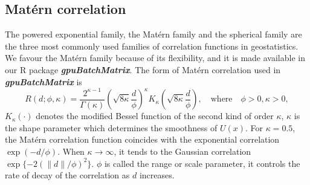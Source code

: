 \documentclass{article}\usepackage[]{graphicx}\usepackage[]{color}
\newcommand{\prog}[1]{\textsf{#1}}
\newcommand{\pkg}[1]{\textbf{\emph{#1}}}
\begin{document}
\subsection{Mat\'ern correlation}
The powered exponential family, the Mat\'ern family and the spherical family are the three most commonly used families of correlation functions in geostatistics. We favour the Mat\'ern family because of its flexibility, and it is made available in our \prog{R} package \pkg{gpuBatchMatrix}. The form of Mat\'ern correlation used in \pkg{gpuBatchMatrix} is 
\begin{equation*}
R(d;\phi,\kappa)=\frac{2^{\kappa-1}}{\Gamma(\kappa)} (\sqrt{8\kappa} \frac{d}{\phi})^\kappa  K_\kappa(\sqrt{8\kappa}  \frac{d}{\phi}),  \quad \text{where} \quad \phi>0,  \kappa > 0,
\end{equation*} 
$K_\kappa(\cdot)$ denotes the modified Bessel function of the second kind of order $\kappa$, 
$\kappa$ is the shape parameter which determines the smoothness of $U(x)$. For $\kappa=0.5$, the Mat\'ern correlation function coincides with the exponential correlation $\exp(-d/\phi)$. When $\kappa \rightarrow \infty$, it tends to the Gaussian correlation $\exp{\{-2(\|d\|/\phi)^2\}}$.
$\phi$ is called the range or scale parameter, it controls the rate of decay of the correlation as $d$ increases. 
\end{document}
